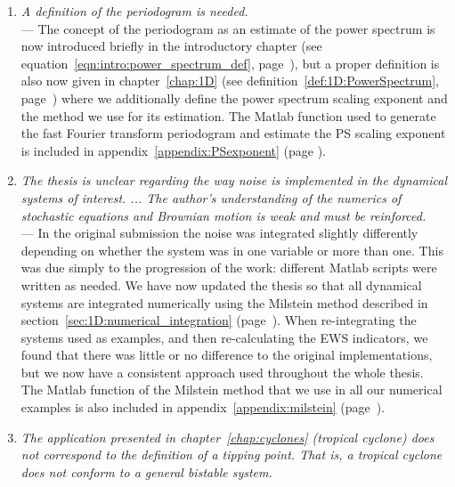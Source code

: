 \begin{enumerate}
	\item \label{rep:gen:periodogram} \emph{A definition of the periodogram is needed.}\\
	— The concept of the periodogram as an estimate of the power spectrum is now introduced briefly in the introductory chapter (see equation~\ref{eqn:intro:power_spectrum_def}, page~\pageref{eqn:intro:power_spectrum_def}), but a proper definition is also now given in chapter~\ref{chap:1D} (see definition~\ref{def:1D:PowerSpectrum}, page~\pageref{def:1D:PowerSpectrum}) where we additionally define the power spectrum scaling exponent and the method we use for its estimation. The Matlab function used to generate the fast Fourier transform periodogram and estimate the PS scaling exponent is included in appendix~\ref{appendix:PSexponent} (page \pageref{appendix:PSexponent}).
	\item \label{rep:gen:stochastic} \emph{The thesis is unclear regarding the way noise is implemented in the dynamical systems of interest. ... The author's understanding of the numerics of stochastic equations and Brownian motion is weak and must be reinforced.}\\
	— In the original submission the noise was integrated slightly differently depending on whether the system was in one variable or more than one. This was due simply to the progression of the work: different Matlab scripts were written as needed. We have now updated the thesis so that all dynamical systems are integrated numerically using the Milstein method described in section~\ref{sec:1D:numerical_integration} (page~\pageref{sec:1D:numerical_integration}). When re-integrating the systems used as examples, and then re-calculating the EWS indicators, we found that there was little or no difference to the original implementations, but we now have a consistent approach used throughout the whole thesis. The Matlab function of the Milstein method that we use in all our numerical examples is also included in appendix~\ref{appendix:milstein} (page~\pageref{appendix:milstein}).
	\item \label{rep:gen:TC} \emph{The application presented in chapter~\ref{chap:cyclones} (tropical cyclone) does not correspond to the definition of a tipping point. That is, a tropical cyclone does not conform to a general bistable system.}\\

\end{enumerate}
